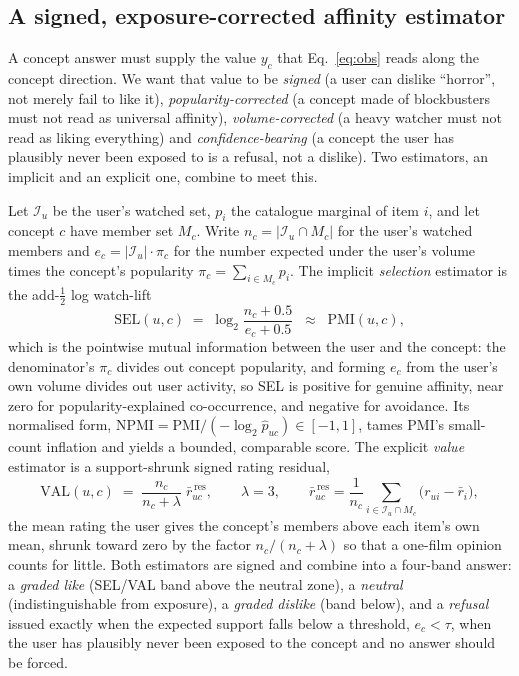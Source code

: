 \documentclass[acmsmall,review,anonymous]{acmart}
\begin{document}
\subsection{A signed, exposure-corrected affinity estimator}\label{sec:concept:est}

A concept answer must supply the value $y_c$ that Eq.~\eqref{eq:obs} reads along the concept direction. We want that value to be \emph{signed} (a user can dislike ``horror'', not merely fail to like it), \emph{popularity-corrected} (a concept made of blockbusters must not read as universal affinity), \emph{volume-corrected} (a heavy watcher must not read as liking everything) and \emph{confidence-bearing} (a concept the user has plausibly never been exposed to is a refusal, not a dislike). Two estimators, an implicit and an explicit one, combine to meet this.

Let $\mathcal I_u$ be the user's watched set, $p_i$ the catalogue marginal of item $i$, and let concept $c$ have member set $M_c$. Write $n_c=|\mathcal I_u\cap M_c|$ for the user's watched members and $e_c=|\mathcal I_u|\cdot\pi_c$ for the number expected under the user's volume times the concept's popularity $\pi_c=\sum_{i\in M_c}p_i$. The implicit \emph{selection} estimator is the add-$\tfrac12$ log watch-lift
\begin{equation}\label{eq:sel}
  \mathrm{SEL}(u,c) \;=\; \log_2\frac{n_c+0.5}{e_c+0.5}
  \;\;\approx\;\; \mathrm{PMI}(u,c),
\end{equation}
which is the pointwise mutual information between the user and the concept: the denominator's $\pi_c$ divides out concept popularity, and forming $e_c$ from the user's own volume divides out user activity, so SEL is positive for genuine affinity, near zero for popularity-explained co-occurrence, and negative for avoidance. Its normalised form, $\mathrm{NPMI}=\mathrm{PMI}/(-\log_2 \hat p_{uc})\in[-1,1]$, tames PMI's small-count inflation and yields a bounded, comparable score. The explicit \emph{value} estimator is a support-shrunk signed rating residual,
\begin{equation}\label{eq:val}
  \mathrm{VAL}(u,c) \;=\; \frac{n_c}{n_c+\lambda}\;\bar r^{\,\mathrm{res}}_{uc},
  \qquad \lambda=3,\qquad
  \bar r^{\,\mathrm{res}}_{uc}=\frac{1}{n_c}\!\!\sum_{i\in\mathcal I_u\cap M_c}\!\!\bigl(r_{ui}-\bar r_i\bigr),
\end{equation}
the mean rating the user gives the concept's members above each item's own mean, shrunk toward zero by the factor $n_c/(n_c+\lambda)$ so that a one-film opinion counts for little. Both estimators are signed and combine into a four-band answer: a \emph{graded like} (SEL/VAL band above the neutral zone), a \emph{neutral} (indistinguishable from exposure), a \emph{graded dislike} (band below), and a \emph{refusal} issued exactly when the expected support falls below a threshold, $e_c<\tau$, when the user has plausibly never been exposed to the concept and no answer should be forced.
\end{document}
